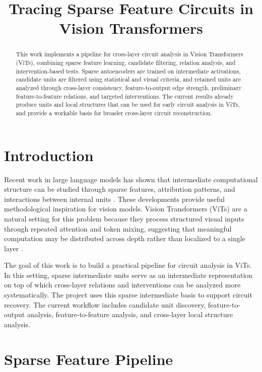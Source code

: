 \documentclass{ccn}
\title{Tracing Sparse Feature Circuits in Vision Transformers}
\begin{document}
\maketitle

\begin{abstract}
This work implements a pipeline for cross-layer circuit analysis in Vision Transformers (ViTs), combining sparse feature learning, candidate filtering, relation analysis, and intervention-based tests. Sparse autoencoders are trained on intermediate activations, candidate units are filtered using statistical and visual criteria, and retained units are analyzed through cross-layer consistency, feature-to-output edge strength, preliminary feature-to-feature relations, and targeted interventions. The current results already produce units and local structures that can be used for early circuit analysis in ViTs, and provide a workable basis for broader cross-layer circuit reconstruction.
\end{abstract}

\section{Introduction}

Recent work in large language models has shown that intermediate computational structure can be studied through sparse features, attribution patterns, and interactions between internal units \citep{Ameisen2025CircuitTracing,Marks2024SparseFeatureCircuits,Templeton2024ScalingMonosemanticity}. These developments provide useful methodological inspiration for vision models. Vision Transformers (ViTs) are a natural setting for this problem because they process structured visual inputs through repeated attention and token mixing, suggesting that meaningful computation may be distributed across depth rather than localized to a single layer \citep{Dosovitskiy2020ViT}.

The goal of this work is to build a practical pipeline for circuit analysis in ViTs. In this setting, sparse intermediate units serve as an intermediate representation on top of which cross-layer relations and interventions can be analyzed more systematically. The project uses this sparse intermediate basis to support circuit recovery. The current workflow includes candidate unit discovery, feature-to-output analysis, feature-to-feature analysis, and cross-layer local structure analysis.

\section{Sparse Feature Pipeline}
\end{document}
